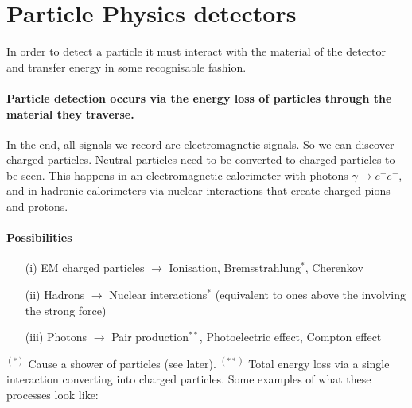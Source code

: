 \section{Particle Physics detectors}

In order to detect a particle it must interact with the material of the detector and transfer energy in some recognisable fashion.
\paragraph{Particle detection occurs via the energy loss of particles through the material they traverse.} In the end, all signals we record are electromagnetic signals. So we can discover charged particles. Neutral particles need to be converted to charged particles to be seen. This happens in an electromagnetic calorimeter with photons $\gamma \to e^+ e^-$, and in hadronic calorimeters via nuclear interactions that create charged pions and protons.

\paragraph{Possibilities}
\begin{itemize}
\item[(i)] EM charged particles $\rightarrow$ Ionisation, Bremsstrahlung$^*$, Cherenkov
\item[(ii)] Hadrons $\rightarrow$ Nuclear interactions$^*$ (equivalent to ones above the involving the strong force)
\item[(iii)] Photons $\rightarrow$ Pair production$^{**}$, Photoelectric effect, Compton effect
\end{itemize}
$^{(*)}$ Cause a shower of particles (see later).\newline
$^{(**)}$ Total energy loss via a single interaction converting into charged particles.\newline
Some examples of what these processes look like:

